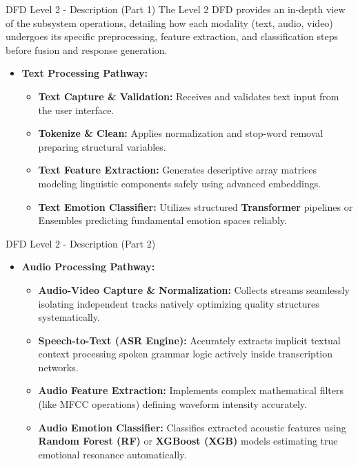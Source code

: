 \documentclass{beamer}
\begin{document}
\begin{frame}{DFD Level 2 - Description (Part 1)}
The Level 2 DFD provides an in-depth view of the subsystem operations, detailing how each modality (text, audio, video) undergoes its specific preprocessing, feature extraction, and classification steps before fusion and response generation.

\begin{itemize}
    \item \textbf{Text Processing Pathway:}
    \begin{itemize}
        \item \textbf{Text Capture \& Validation:} Receives and validates text input from the user interface.
        \item \textbf{Tokenize \& Clean:} Applies normalization and stop-word removal preparing structural variables.
        \item \textbf{Text Feature Extraction:} Generates descriptive array matrices modeling linguistic components safely using advanced embeddings.
        \item \textbf{Text Emotion Classifier:} Utilizes structured \textbf{Transformer} pipelines or Ensembles predicting fundamental emotion spaces reliably.
    \end{itemize}
\end{itemize}
\end{frame}

\begin{frame}{DFD Level 2 - Description (Part 2)}
\begin{itemize}
    \item \textbf{Audio Processing Pathway:}
    \begin{itemize}
        \item \textbf{Audio-Video Capture \& Normalization:} Collects streams seamlessly isolating independent tracks natively optimizing quality structures systematically.
        \item \textbf{Speech-to-Text (ASR Engine):} Accurately extracts implicit textual context processing spoken grammar logic actively inside transcription networks.
        \item \textbf{Audio Feature Extraction:} Implements complex mathematical filters (like MFCC operations) defining waveform intensity accurately.
        \item \textbf{Audio Emotion Classifier:} Classifies extracted acoustic features using \textbf{Random Forest (RF)} or \textbf{XGBoost (XGB)} models estimating true emotional resonance automatically.
    \end{itemize}
\end{itemize}
\end{frame}
\end{document}
